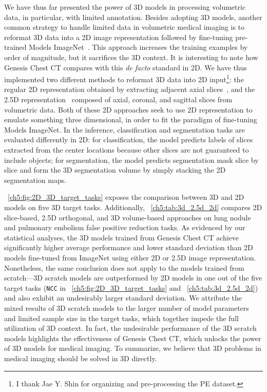 We have thus far presented the power of 3D models in processing volumetric data, in particular, with limited annotation. Besides adopting 3D models, another common strategy to handle limited data in volumetric medical imaging is to reformat 3D data into a 2D image representation followed by fine-tuning pre-trained Models ImageNet~\citep{shin2016deep,tajbakhsh2016convolutional}. This approach increases the training examples by order of magnitude, but it sacrifices the 3D context. It is interesting to note how Genesis Chest CT compares with this \textit{de facto} standard in 2D. We have thus implemented two different methods to reformat 3D data into 2D input\footnote{I thank Jae Y. Shin for organizing and pre-processing the PE dataset.}: the regular 2D representation obtained by extracting adjacent axial slices~\citep{ben2016fully,sun2017multiphase}, and the 2.5D representation~\citep{prasoon2013deep,roth2014new,roth2015improving} composed of axial, coronal, and sagittal slices from volumetric data. Both of these 2D approaches seek to use 2D representation to emulate something three dimensional, in order to fit the paradigm of fine-tuning Models ImageNet. 
In the inference, classification and segmentation tasks are evaluated differently in 2D: for classification, the model predicts labels of slices extracted from the center locations because other slices are not guaranteed to include objects; for segmentation, the model predicts segmentation mask slice by slice and form the 3D segmentation volume by simply stacking the 2D segmentation maps.


\figurename~\ref{ch5:fig:2D_3D_target_tasks} exposes the comparison between 3D and 2D models on five 3D target tasks. Additionally, \tablename~\ref{ch5:tab:3d_2.5d_2d} compares 2D slice-based, 2.5D orthogonal, and 3D volume-based approaches on lung nodule and pulmonary embolism false positive reduction tasks. As evidenced by our statistical analyses, the 3D models trained from Genesis Chest CT achieve significantly higher average performance and lower standard deviation than 2D models fine-tuned from ImageNet using either 2D or 2.5D image representation. Nonetheless, the same conclusion does not apply to the models trained from scratch---3D scratch models are outperformed by 2D models in one out of the five target tasks (\ie \texttt{NCC} in \figurename~\ref{ch5:fig:2D_3D_target_tasks} and \tablename~\ref{ch5:tab:3d_2.5d_2d}) and also exhibit an undesirably larger standard deviation. We attribute the mixed results of 3D scratch models to the larger number of model parameters and limited sample size in the target tasks, which together impede the full utilization of 3D context. In fact, the undesirable performance of the 3D scratch models highlights the effectiveness of Genesis Chest CT, which unlocks the power of 3D models for medical imaging. To summarize, we believe that 3D problems in medical imaging should be solved in 3D directly.


